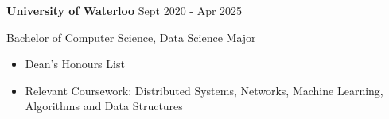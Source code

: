 \textbf{University of Waterloo} \hfill Sept 2020 - Apr 2025\par
Bachelor of Computer Science, Data Science Major \par %
\begin{itemize}
  \item Dean's Honours List
  \item Relevant Coursework: Distributed Systems, Networks, Machine Learning, Algorithms and Data Structures
\end{itemize}
\vspace{0.1cm} \par
